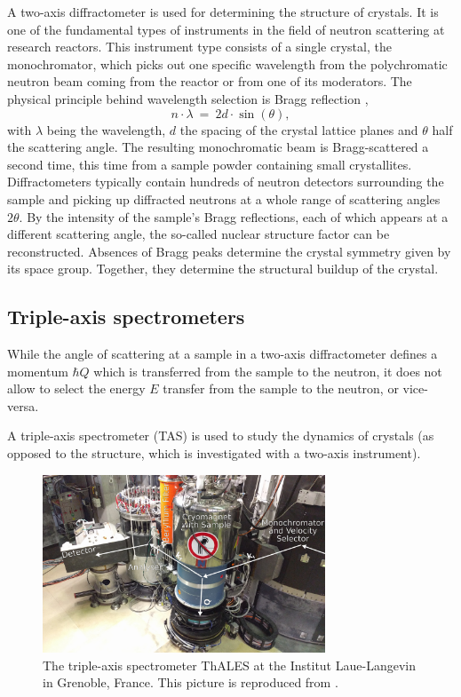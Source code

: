 A two-axis diffractometer is used for determining the structure of crystals. It is one of the fundamental types of instruments in the field of neutron scattering at research reactors. This instrument type consists of a single crystal, the monochromator, which picks out one specific wavelength from the polychromatic neutron beam coming from the reactor or from one of its moderators. The physical principle behind wavelength selection is Bragg reflection \cite[p. 68]{Gross2012}, 
\begin{equation}
	n \cdot \lambda \ =\  2 d \cdot \sin\left(\theta\right),
\end{equation}
with $\lambda$ being the wavelength, $d$ the spacing of the crystal lattice planes and $\theta$ half the scattering angle.
The resulting monochromatic beam is Bragg-scattered a second time, this time from a sample powder containing small crystallites. Diffractometers typically contain hundreds of neutron detectors surrounding the sample and picking up diffracted neutrons at a whole range of scattering angles $2 \theta$. By the intensity of the sample's Bragg reflections, each of which appears at a different scattering angle, the so-called nuclear structure factor can be reconstructed. Absences of Bragg peaks determine the crystal symmetry given by its space group. Together, they determine the structural buildup of the crystal.


\subsection{Triple-axis spectrometers}

While the angle of scattering at a sample in a two-axis diffractometer defines a momentum $\hbar Q$ which is transferred from the sample to the neutron, it does not allow to select the energy $E$ transfer from the sample to the neutron, or vice-versa.


A triple-axis spectrometer (TAS) is used to study the dynamics of crystals (as opposed to the structure, which is investigated with a two-axis instrument).


\clearpage
\begin{figure}[htb]
	\centering
	\includegraphics[width=0.75\textwidth]{figures/thales.jpg}
	\caption{The triple-axis spectrometer ThALES \cite{thales} at the Institut Laue-Langevin in Grenoble, France. This picture is reproduced from \cite{TODO}.}
	\label{fig:thales}
\end{figure}



